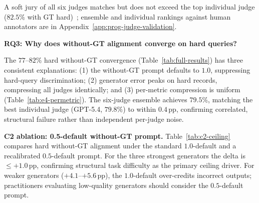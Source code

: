 A soft jury of all six judges matches but does not exceed the top individual judge ($82.5\%$ with GT hard)~\citep{verga2024jury}; ensemble and individual rankings against human annotators are in Appendix~\ref{app:prog-judge-validation}.

\textbf{RQ3: Why does without-GT alignment converge on hard queries?}
\label{sec:exp:ceiling}

The $77$--$82\%$ hard without-GT convergence (Table~\ref{tab:full-results}) has three consistent explanations: (1) the without-GT prompt defaults to $1.0$, suppressing hard-query discrimination; (2) generator error peaks on hard records, compressing all judges identically; and (3) per-metric compression is uniform (Table~\ref{tab:e4-permetric}). The six-judge ensemble achieves $79.5\%$, matching the best individual judge (GPT-5.4, $79.8\%$) to within $0.4$\,pp, confirming correlated, structural failure rather than independent per-judge noise.

\begin{table}[t]
\centering
\small
\setlength{\tabcolsep}{5pt}
\renewcommand{\arraystretch}{1.02}

\vspace{-0.1cm}
\caption{Hard without GT alignment (\%) under the standard 1.0-default and the recalibrated 0.5-default prompts, averaged across six judges per generator. $\Delta$ = (0.5-default) $-$ (1.0-default).}
\label{tab:c2-ceiling}
\vspace{-0.5cm}
\end{table}

\textbf{C2 ablation: 0.5-default without-GT prompt.} Table~\ref{tab:c2-ceiling} compares hard without-GT alignment under the standard $1.0$-default and a recalibrated $0.5$-default prompt. For the three strongest generators the delta is ${\leq}{+1.0}$\,pp, confirming structural task difficulty as the primary ceiling driver. For weaker generators ($+4.1$--$+5.6$\,pp), the $1.0$-default over-credits incorrect outputs; practitioners evaluating low-quality generators should consider the $0.5$-default prompt.

